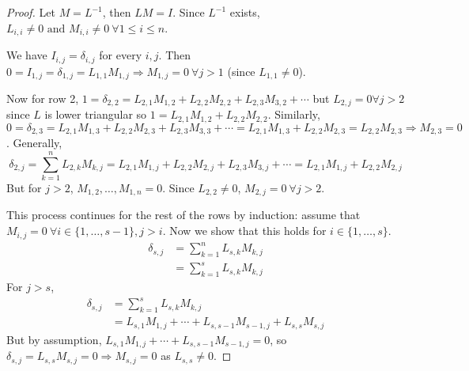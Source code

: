 \documentclass[12pt,a4paper]{article}
\theoremstyle{definition}
\begin{document}
\begin{proof}
	Let $M = L^{-1}$, then $LM = I$. Since $L^{-1}$ exists, $L_{i, i} \ne 0 \text{ and } M_{i, i} \ne 0 \ \forall 1 \le i \le n$.

	We have $I_{i, j} = \delta_{i, j}$ for every $i, j$. Then $0 = I_{1, j} = \delta_{1, j} = L_{1, 1} M_{1, j} \Rightarrow M_{1, j} = 0 \ \forall j > 1$ (since $L_{1, 1} \ne 0$).

	Now for row 2, $1 = \delta_{2, 2} = L_{2, 1} M_{1, 2} + L_{2, 2} M_{2, 2} + L_{2, 3} M_{3, 2} + \cdots$ but $L_{2, j} = 0 \forall j > 2$ since $L$ is lower triangular so $1 = L_{2, 1} M_{1, 2} + L_{2, 2} M_{2, 2}$. Similarly, $0 = \delta_{2, 3} = L_{2, 1} M_{1, 3} + L_{2, 2} M_{2, 3} + L_{2, 3} M_{3, 3} + \cdots = L_{2, 1} M_{1, 3} + L_{2, 2} M_{2, 3} = L_{2, 2} M_{2, 3} \Rightarrow M_{2, 3} = 0$. Generally,
	\[
		\delta_{2, j} = \sum_{k = 1}^{n} L_{2, k} M_{k, j} = L_{2, 1} M_{1, j} + L_{2, 2} M_{2, j} + L_{2, 3} M_{3, j} + \cdots = L_{2, 1} M_{1, j} + L_{2, 2} M_{2, j}
	\]
	But for $j > 2$, $M_{1, 2}, \dots, M_{1, n} = 0$. Since $L_{2, 2} \ne 0$, $M_{2, j} = 0 \ \forall j > 2$.

	This process continues for the rest of the rows by induction: assume that $M_{i, j} = 0 \ \forall i \in \{ 1, \dots, s - 1 \}, j > i$. Now we show that this holds for $i \in \{ 1, \dots, s \}$.
	\[
		\begin{aligned}
			\delta_{s, j}
				& = \sum_{k = 1}^{n} L_{s, k} M_{k, j} \\
				& = \sum_{k = 1}^{s} L_{s, k} M_{k, j}
		\end{aligned}
	\]
	For $j > s$,
	\[
		\begin{aligned}
			\delta_{s, j}
				& = \sum_{k = 1}^{s} L_{s, k} M_{k, j} \\
				& = L_{s, 1} M_{1, j} + \cdots + L_{s, s - 1} M_{s - 1, j} + L_{s, s} M_{s, j}
		\end{aligned}
	\]
	But by assumption, $L_{s, 1} M_{1, j} + \cdots + L_{s, s - 1} M_{s - 1, j} = 0$, so $\delta_{s, j} = L_{s, s} M_{s, j} = 0 \Rightarrow M_{s, j} = 0$ as $L_{s, s} \ne 0$.
\end{proof}
\end{document}

